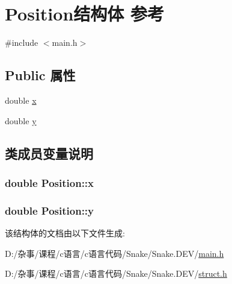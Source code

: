 \hypertarget{struct_position}{}\section{Position结构体 参考}
\label{struct_position}


{\ttfamily \#include $<$main.\+h$>$}

\subsection*{Public 属性}
\begin{DoxyCompactItemize}
\item 
double \hyperlink{struct_position_a9abbe738bad177de91fe4774099c1260}{x}
\item 
double \hyperlink{struct_position_a75f48c2a1d2c7131b8be1a0687ae72c8}{y}
\end{DoxyCompactItemize}


\subsection{类成员变量说明}
\hypertarget{struct_position_a9abbe738bad177de91fe4774099c1260}{}
\subsubsection[{x}]{\setlength{\rightskip}{0pt plus 5cm}double Position\+::x}\label{struct_position_a9abbe738bad177de91fe4774099c1260}
\hypertarget{struct_position_a75f48c2a1d2c7131b8be1a0687ae72c8}{}
\subsubsection[{y}]{\setlength{\rightskip}{0pt plus 5cm}double Position\+::y}\label{struct_position_a75f48c2a1d2c7131b8be1a0687ae72c8}


该结构体的文档由以下文件生成\+:\begin{DoxyCompactItemize}
\item 
D\+:/杂事/课程/c语言/c语言代码/\+Snake/\+Snake.\+D\+E\+V/\hyperlink{main_8h}{main.\+h}\item 
D\+:/杂事/课程/c语言/c语言代码/\+Snake/\+Snake.\+D\+E\+V/\hyperlink{struct_8h}{struct.\+h}\end{DoxyCompactItemize}

